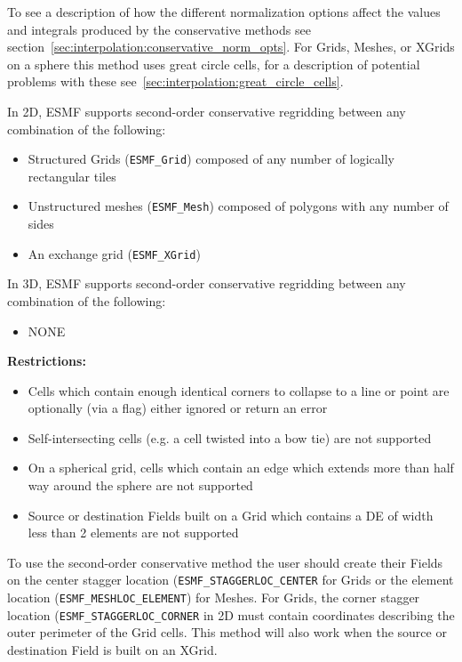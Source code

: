 \smallskip

 To see a description of how the different normalization options affect the values and integrals produced by the conservative methods see section~\ref{sec:interpolation:conservative_norm_opts}. For Grids, Meshes, or XGrids on a sphere this method uses great circle cells, for a description of potential problems with these see~\ref{sec:interpolation:great_circle_cells}.


\smallskip

 In 2D, ESMF supports second-order conservative regridding between any combination of the following:
 \begin{itemize}
 \item Structured Grids ({\tt ESMF\_Grid}) composed of any number of logically rectangular tiles
 \item Unstructured meshes ({\tt ESMF\_Mesh}) composed of polygons with any number of sides
 \item An exchange grid ({\tt ESMF\_XGrid})
 \end{itemize}

\smallskip

 In 3D, ESMF supports second-order conservative regridding between any combination of the following:
 \begin{itemize}
 \item NONE
 \end{itemize}

\smallskip

{\bf Restrictions:}
 \begin{itemize}
 \item Cells which contain enough identical corners to collapse to a line or point are optionally (via a flag) either ignored or return an error
 \item Self-intersecting cells (e.g. a cell twisted into a bow tie) are not supported
 \item On a spherical grid, cells which contain an edge which extends more than half way around the sphere are not supported 
 \item Source or destination Fields built on a Grid which contains a DE of width less than 2 elements are not supported
 \end{itemize}
 
\smallskip

 To use the second-order conservative method the user should create their Fields on the center 
 stagger location ({\tt ESMF\_STAGGERLOC\_CENTER} for Grids  or the element location ({\tt ESMF\_MESHLOC\_ELEMENT}) for Meshes.
 For Grids, the corner stagger location ({\tt ESMF\_STAGGERLOC\_CORNER} in 2D must contain coordinates describing the outer perimeter of the Grid cells. 
 This method will also work when the source or destination Field is built on an XGrid.

